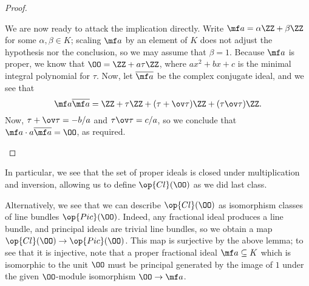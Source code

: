 \documentclass[../notes.tex]{subfiles}
\begin{document}
\begin{proof}
\begin{itemize}
		We are now ready to attack the implication directly. Write $\mf a=\alpha\ZZ+\beta\ZZ$ for some $\alpha,\beta\in K$; scaling $\mf a$ by an element of $K$ does not adjust the hypothesis nor the conclusion, so we may assume that $\beta=1$. Because $\mf a$ is proper, we know that $\OO=\ZZ+a\tau\ZZ$, where $ax^2+bx+c$ is the minimal integral polynomial for $\tau$. Now, let $\overline{\mf a}$ be the complex conjugate ideal, and we see that
		\[\mf a\overline{\mf a}=\ZZ+\tau\ZZ+(\tau+\ov\tau)\ZZ+(\tau\ov\tau)\ZZ.\]
		Now, $\tau+\ov\tau=-b/a$ and $\tau\ov\tau=c/a$, so we conclude that $\mf a\cdot a\overline{\mf a}=\OO$, as required.
		\qedhere
	\end{itemize}
\end{proof}
\begin{remark}
	In particular, we see that the set of proper ideals is closed under multiplication and inversion, allowing us to define $\op{Cl}(\OO)$ as we did last class.
\end{remark}
\begin{remark}
	Alternatively, we see that we can describe $\op{Cl}(\OO)$ as isomorphism classes of line bundles $\op{Pic}(\OO)$. Indeed, any fractional ideal produces a line bundle, and principal ideals are trivial line bundles, so we obtain a map $\op{Cl}(\OO)\to\op{Pic}(\OO)$. This map is surjective by the above lemma; to see that it is injective, note that a proper fractional ideal $\mf a\subseteq K$ which is isomorphic to the unit $\OO$ must be principal generated by the image of $1$ under the given $\OO$-module isomorphism $\OO\to\mf a$.
\end{remark}
\end{document}
